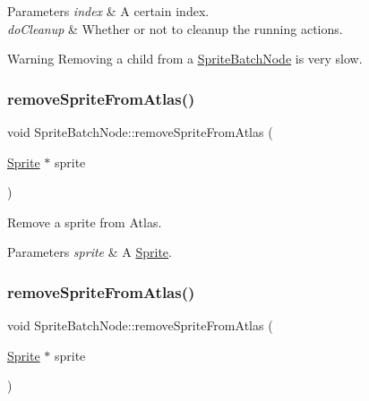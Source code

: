 \begin{DoxyParams}{Parameters}
{\em index} & A certain index. \\
\hline
{\em do\+Cleanup} & Whether or not to cleanup the running actions. \\
\hline
\end{DoxyParams}
\begin{DoxyWarning}{Warning}
Removing a child from a \hyperlink{classSpriteBatchNode}{Sprite\+Batch\+Node} is very slow. 
\end{DoxyWarning}
\mbox{\label{classSpriteBatchNode_a3e6e600aa1cf10812ae36b2930e56e9d}} 
\subsubsection{\texorpdfstring{remove\+Sprite\+From\+Atlas()}{removeSpriteFromAtlas()}\hspace{0.1cm}{\footnotesize\ttfamily [1/2]}}
{\footnotesize\ttfamily void Sprite\+Batch\+Node\+::remove\+Sprite\+From\+Atlas (\begin{DoxyParamCaption}\item[{\hyperlink{classSprite}{Sprite} $\ast$}]{sprite }\end{DoxyParamCaption})}

Remove a sprite from Atlas.


\begin{DoxyParams}{Parameters}
{\em sprite} & A \hyperlink{classSprite}{Sprite}. \\
\hline
\end{DoxyParams}
\mbox{\label{classSpriteBatchNode_a3e6e600aa1cf10812ae36b2930e56e9d}} 
\subsubsection{\texorpdfstring{remove\+Sprite\+From\+Atlas()}{removeSpriteFromAtlas()}\hspace{0.1cm}{\footnotesize\ttfamily [2/2]}}
{\footnotesize\ttfamily void Sprite\+Batch\+Node\+::remove\+Sprite\+From\+Atlas (\begin{DoxyParamCaption}\item[{\hyperlink{classSprite}{Sprite} $\ast$}]{sprite }\end{DoxyParamCaption})}

